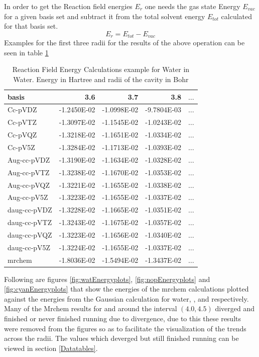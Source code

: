 \documentclass[../master_thesis.tex]{subfiles}
\begin{document}
In order to get the Reaction field
energies $E_r$ one needs the gas state Energy $E_{vac}$ for a given
basis set and subtract it from the total solvent energy $E_{tot}$ calculated for
that basis set.
\begin{equation}
  E_r = E_{tot} - E_{vac}
\end{equation}
Examples for the first three radii for the results of the above operation can be
seen in table \ref{tab:Erwatdata}

\begin{table}[htbp]
\caption{Reaction Field Energy Calculations example for Water in Water. Energy in Hartree and radii of the cavity in Bohr}
\begin{center}
\begin{tabular}{|l|r|r|r|r|}
\hline
basis & 3.6 & 3.7 & 3.8 & $\ldots$\\ \hline
Cc-pVDZ & -1.2450E-02 & -1.0998E-02 & -9.7804E-03 & $\ldots$\\ \hline
Cc-pVTZ & -1.3097E-02 & -1.1545E-02 & -1.0243E-02 & $\ldots$\\ \hline
Cc-pVQZ & -1.3218E-02 & -1.1651E-02 & -1.0334E-02 & $\ldots$\\ \hline
Cc-pV5Z & -1.3284E-02 & -1.1713E-02 & -1.0393E-02 & $\ldots$\\ \hline
Aug-cc-pVDZ & -1.3190E-02 & -1.1634E-02 & -1.0328E-02 & $\ldots$\\ \hline
Aug-cc-pVTZ & -1.3238E-02 & -1.1670E-02 & -1.0353E-02 & $\ldots$\\ \hline
Aug-cc-pVQZ & -1.3221E-02 & -1.1655E-02 & -1.0338E-02 & $\ldots$\\ \hline
Aug-cc-pV5Z & -1.3223E-02 & -1.1655E-02 & -1.0337E-02 & $\ldots$\\ \hline
daug-cc-pVDZ & -1.3228E-02 & -1.1665E-02 & -1.0351E-02 & $\ldots$\\ \hline
daug-cc-pVTZ & -1.3243E-02 & -1.1675E-02 & -1.0357E-02 & $\ldots$\\ \hline
daug-cc-pVQZ & -1.3223E-02 & -1.1656E-02 & -1.0340E-02 & $\ldots$\\ \hline
daug-cc-pV5Z & -1.3224E-02 & -1.1655E-02 & -1.0337E-02 & $\ldots$\\ \hline
mrchem & -1.8036E-02 & -1.5494E-02 & -1.3437E-02 & $\ldots$\\ \hline
\end{tabular}
\end{center}
\label{tab:Erwatdata}
\end{table}

Following are figures \ref{fig:watEnergyplots},
\ref{fig:nopEnergyplots} and \ref{fig:cyanEnergyplots}
that show the energies of the mrchem calculations plotted
against the energies from the Gaussian calculation for water, , and
 respectively. Many of the Mrchem results for  and 
around the interval $(4.0, 4.5)$ diverged and finished or never finished
running due to divergence, due to this these results were removed from the figures so as to facilitate
the visualization of the trends across the radii. The values which deverged but still
finished running can be viewed in section \ref{Datatables}.
\end{document}
